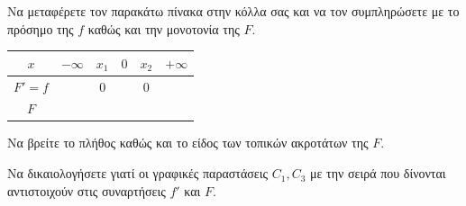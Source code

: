 \begin{alist}
\item
    \begin{rlist}
    \item Να μεταφέρετε τον παρακάτω πίνακα στην κόλλα σας και να τον συμπληρώσετε με το πρόσημο της $f$ καθώς και την μονοτονία της $F$.
    \begin{center}
    \begin{tabular}{|c|c|c|c|c|c|}
        \hline
        $x$ & $-\infty$ & $x_1$ & $0$ & $x_2$ & $+\infty$ \\
        \hline
        $F'=f$ & & $0$ & & $0$ & \\
        \hline
        $F$ & & & & & \\
        \hline
    \end{tabular}
    \end{center}
    \item Να βρείτε το πλήθος καθώς και το είδος των τοπικών ακροτάτων της $F$.
    \end{rlist}
\item[$\beta)$] Να δικαιολογήσετε γιατί οι γραφικές παραστάσεις $C_1, C_3$ με την σειρά που δίνονται αντιστοιχούν στις συναρτήσεις $f'$ και $F$.
\end{alist}